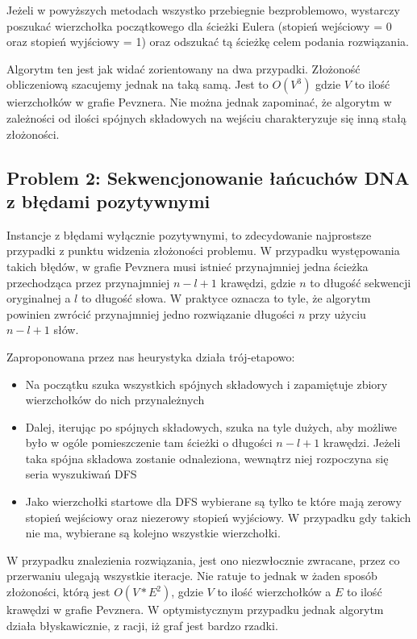 \documentclass[a4paper]{article}
\begin{document}
Jeżeli w powyższych metodach wszystko przebiegnie bezproblemowo, wystarczy poszukać wierzchołka początkowego dla ścieżki
Eulera (stopień wejściowy = 0 oraz stopień wyjściowy = 1) oraz odszukać tą ścieżkę celem podania rozwiązania.

Algorytm ten jest jak widać zorientowany na dwa przypadki. Złożoność obliczeniową szacujemy jednak na taką samą.
Jest to $O(V^3)$ gdzie $V$ to ilość wierzchołków w grafie Pevznera. Nie można jednak zapominać, że algorytm w zależności
od ilości spójnych składowych na wejściu charakteryzuje się inną stałą złożoności.

\subsection{Problem 2: Sekwencjonowanie łańcuchów DNA z błędami pozytywnymi}
Instancje z błędami wyłącznie pozytywnymi, to zdecydowanie najprostsze przypadki z punktu widzenia złożoności problemu.
W przypadku występowania takich błędów, w grafie Pevznera musi istnieć przynajmniej jedna ścieżka przechodząca przez
przynajmniej $n-l+1$ krawędzi, gdzie $n$ to długość sekwencji oryginalnej a $l$ to długość słowa. W praktyce oznacza to tyle,
że algorytm powinien zwrócić przynajmniej jedno rozwiązanie długości $n$ przy użyciu $n-l+1$ słów.

Zaproponowana przez nas heurystyka działa trój-etapowo:
\begin{itemize}
\item Na początku szuka wszystkich spójnych składowych i zapamiętuje zbiory wierzchołków do nich przynależnych
\item Dalej, iterując po spójnych składowych, szuka na tyle dużych, aby możliwe było w ogóle pomieszczenie tam ścieżki
o długości $n-l+1$ krawędzi. Jeżeli taka spójna składowa zostanie odnaleziona, wewnątrz niej rozpoczyna się seria
wyszukiwań DFS
\item Jako wierzchołki startowe dla DFS wybierane są tylko te które mają zerowy stopień wejściowy oraz niezerowy
stopień wyjściowy. W przypadku gdy takich nie ma, wybierane są kolejno wszystkie wierzchołki.
\end{itemize}

W przypadku znalezienia rozwiązania, jest ono niezwłocznie zwracane, przez co przerwaniu ulegają wszystkie iteracje.
Nie ratuje to jednak w żaden sposób złożoności, którą jest $O(V*E^2)$, gdzie $V$ to ilość wierzchołków a $E$ to ilość
krawędzi w grafie Pevznera. W optymistycznym przypadku jednak algorytm działa błyskawicznie, z racji, iż graf jest
bardzo rzadki.
\end{document}
